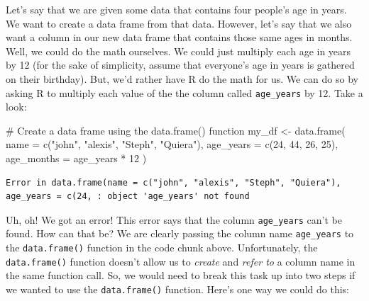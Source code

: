 \documentclass[
  letterpaper,
  DIV=11,
  numbers=noendperiod]{scrreprt}
\newenvironment{Shaded}{\begin{snugshade}}{\end{snugshade}}
\newcommand{\AttributeTok}[1]{\textcolor[rgb]{0.40,0.45,0.13}{#1}}
\newcommand{\CommentTok}[1]{\textcolor[rgb]{0.37,0.37,0.37}{#1}}
\newcommand{\DecValTok}[1]{\textcolor[rgb]{0.68,0.00,0.00}{#1}}
\newcommand{\FunctionTok}[1]{\textcolor[rgb]{0.28,0.35,0.67}{#1}}
\newcommand{\NormalTok}[1]{\textcolor[rgb]{0.00,0.23,0.31}{#1}}
\newcommand{\OtherTok}[1]{\textcolor[rgb]{0.00,0.23,0.31}{#1}}
\newcommand{\SpecialCharTok}[1]{\textcolor[rgb]{0.37,0.37,0.37}{#1}}
\newcommand{\StringTok}[1]{\textcolor[rgb]{0.13,0.47,0.30}{#1}}
\begin{document}
Let's say that we are given some data that contains four people's age in
years. We want to create a data frame from that data. However, let's say
that we also want a column in our new data frame that contains those
same ages in months. Well, we could do the math ourselves. We could just
multiply each age in years by 12 (for the sake of simplicity, assume
that everyone's age in years is gathered on their birthday). But, we'd
rather have R do the math for us. We can do so by asking R to multiply
each value of the the column called \texttt{age\_years} by 12. Take a
look:

\begin{Shaded}
\begin{Highlighting}[]
\CommentTok{\# Create a data frame using the data.frame() function}
\NormalTok{my\_df }\OtherTok{\textless{}{-}} \FunctionTok{data.frame}\NormalTok{(}
  \AttributeTok{name       =} \FunctionTok{c}\NormalTok{(}\StringTok{"john"}\NormalTok{, }\StringTok{"alexis"}\NormalTok{, }\StringTok{"Steph"}\NormalTok{, }\StringTok{"Quiera"}\NormalTok{),}
  \AttributeTok{age\_years  =} \FunctionTok{c}\NormalTok{(}\DecValTok{24}\NormalTok{, }\DecValTok{44}\NormalTok{, }\DecValTok{26}\NormalTok{, }\DecValTok{25}\NormalTok{),}
  \AttributeTok{age\_months =}\NormalTok{ age\_years }\SpecialCharTok{*} \DecValTok{12}
\NormalTok{)}
\end{Highlighting}
\end{Shaded}

\begin{verbatim}
Error in data.frame(name = c("john", "alexis", "Steph", "Quiera"), age_years = c(24, : object 'age_years' not found
\end{verbatim}

Uh, oh! We got an error! This error says that the column
\texttt{age\_years} can't be found. How can that be? We are clearly
passing the column name \texttt{age\_years} to the \texttt{data.frame()}
function in the code chunk above. Unfortunately, the
\texttt{data.frame()} function doesn't allow us to \emph{create} and
\emph{refer to} a column name in the same function call. So, we would
need to break this task up into two steps if we wanted to use the
\texttt{data.frame()} function. Here's one way we could do this:
\end{document}
